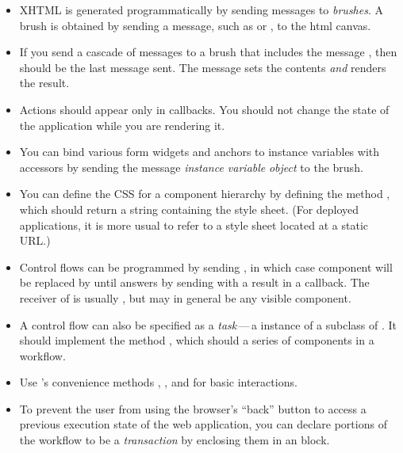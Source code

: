 \documentclass[a4paper,10pt,twoside]{book}
\begin{document}
\begin{itemize}
  \item XHTML is generated programmatically by sending messages to \emph{brushes}. A brush is obtained by sending a message, such as  or , to the html canvas.
  \item If you send a cascade of messages to a brush that includes the message , then  should be the last message sent.
  The  message sets the contents \emph{and} renders the result.
  \item Actions should appear only in callbacks.
You should not change the state of the application while you are rendering it.
  \item You can bind various form widgets and anchors to instance variables with accessors by sending the message  \emph{instance variable}  \emph{object} to the brush.
  \item You can define the CSS for a component hierarchy by defining the method , which should return a string containing the style sheet.
  (For deployed applications, it is more usual to refer to a style sheet located at a static URL.)
  \item Control flows can be programmed by sending , in which case component  will be replaced by  until  answers by sending  with a result in a callback.
  The receiver of  is usually , but may in general be any visible component.
  \item A control flow can also be specified as a \emph{task}\,---\,a instance of a subclass of . It should implement the method , which should  a series of components in a workflow.
  \item Use 's convenience methods , ,  and  for basic interactions.
  \item To prevent the user from using the browser's ``back'' button to access a previous execution state of the web application, you can declare portions of the workflow to be a \emph{transaction} by enclosing them in an  block.
\end{itemize}

\ifx\wholebook\relax\else 
   
   
\end{document}
